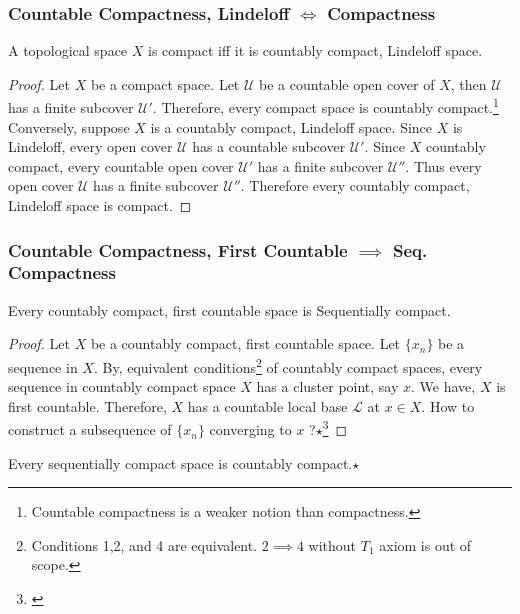 \subsubsection{Countable Compactness, Lindeloff $\iff$ Compactness}
\begin{theorem}
	A topological space $X$ is compact iff it is countably compact, Lindeloff space.
\end{theorem}
\begin{proof}
	Let $X$ be a compact space. Let $\mathcal{U}$ be a  countable open cover of $X$, then $\mathcal{U}$ has a finite subcover $\mathcal{U}'$. Therefore, every compact space is countably compact.\footnote{Countable compactness is a weaker notion than compactness.}\\

	Conversely, suppose $X$ is a countably compact, Lindeloff space.  Since $X$ is Lindeloff, every open cover $\mathcal{U}$ has a countable subcover $\mathcal{U}'$. Since $X$ countably compact, every countable open cover $\mathcal{U}'$ has a finite subcover $\mathcal{U}''$. Thus every open cover $\mathcal{U}$ has a finite subcover $\mathcal{U}''$. Therefore every countably compact, Lindeloff space is compact.
\end{proof}

\subsubsection{Countable Compactness, First Countable $\implies$ Seq. Compactness}
\begin{theorem}
	Every countably compact, first countable space is Sequentially compact.
\end{theorem}
\begin{proof}
	Let $X$ be a countably compact, first countable space. Let $\{x_n\}$ be a sequence in $X$. By, equivalent conditions\footnote{\cite[11.1]{joshi} Conditions 1,2, and 4 are equivalent. $2 \implies 4$ without $T_1$ axiom is out of scope.} of countably compact spaces, every sequence in countably compact space $X$ has a cluster point, say $x$. We have, $X$ is first countable. Therefore, $X$ has a countable local base $\mathcal{L}$ at $x \in X$. How to construct a subsequence of $\{x_n\}$ converging to $x$ ?$\star$\footnote{\cite[Exercises 10.1.11]{joshi}}
\end{proof}

\begin{remark}
	Every sequentially compact space is countably compact.$\star$
\end{remark}

